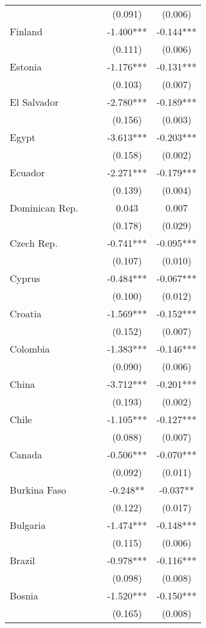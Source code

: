 \documentclass[]{article}
\begin{document}
\begin{tabular}{lcccc}
 &  &  & (0.091) & (0.006) \\
Finland &  &  & -1.400*** & -0.144*** \\
 &  &  & (0.111) & (0.006) \\
Estonia &  &  & -1.176*** & -0.131*** \\
 &  &  & (0.103) & (0.007) \\
El Salvador &  &  & -2.780*** & -0.189*** \\
 &  &  & (0.156) & (0.003) \\
Egypt &  &  & -3.613*** & -0.203*** \\
 &  &  & (0.158) & (0.002) \\
Ecuador &  &  & -2.271*** & -0.179*** \\
 &  &  & (0.139) & (0.004) \\
Dominican Rep. &  &  & 0.043 & 0.007 \\
 &  &  & (0.178) & (0.029) \\
Czech Rep. &  &  & -0.741*** & -0.095*** \\
 &  &  & (0.107) & (0.010) \\
Cyprus &  &  & -0.484*** & -0.067*** \\
 &  &  & (0.100) & (0.012) \\
Croatia &  &  & -1.569*** & -0.152*** \\
 &  &  & (0.152) & (0.007) \\
Colombia &  &  & -1.383*** & -0.146*** \\
 &  &  & (0.090) & (0.006) \\
China &  &  & -3.712*** & -0.201*** \\
 &  &  & (0.193) & (0.002) \\
Chile &  &  & -1.105*** & -0.127*** \\
 &  &  & (0.088) & (0.007) \\
Canada &  &  & -0.506*** & -0.070*** \\
 &  &  & (0.092) & (0.011) \\
Burkina Faso &  &  & -0.248** & -0.037** \\
 &  &  & (0.122) & (0.017) \\
Bulgaria &  &  & -1.474*** & -0.148*** \\
 &  &  & (0.115) & (0.006) \\
Brazil &  &  & -0.978*** & -0.116*** \\
 &  &  & (0.098) & (0.008) \\
Bosnia &  &  & -1.520*** & -0.150*** \\
 &  &  & (0.165) & (0.008) \\

\end{tabular}
\end{document}
